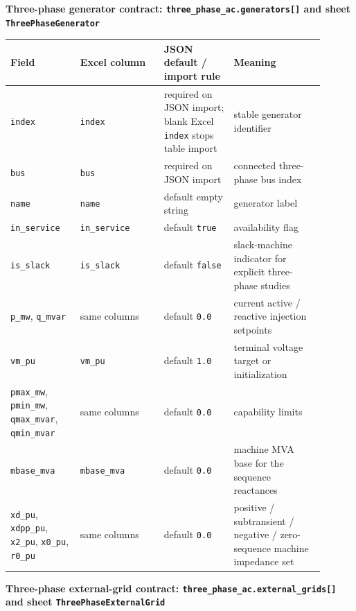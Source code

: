 \noindent\textbf{Three-phase generator contract: \texttt{three\_phase\_ac.generators[]} and sheet \texttt{ThreePhaseGenerator}}

\begin{longtable}{L{0.20\linewidth}L{0.24\linewidth}L{0.20\linewidth}L{0.26\linewidth}}
\toprule
Field & Excel column & JSON default / import rule & Meaning \\
\midrule
\endhead
\texttt{index} & \texttt{index} & required on JSON import; blank Excel \texttt{index} stops table import & stable generator identifier \\
\texttt{bus} & \texttt{bus} & required on JSON import & connected three-phase bus index \\
\texttt{name} & \texttt{name} & default empty string & generator label \\
\texttt{in\_service} & \texttt{in\_service} & default \texttt{true} & availability flag \\
\texttt{is\_slack} & \texttt{is\_slack} & default \texttt{false} & slack-machine indicator for explicit three-phase studies \\
\texttt{p\_mw}, \texttt{q\_mvar} & same columns & default \texttt{0.0} & current active / reactive injection setpoints \\
\texttt{vm\_pu} & \texttt{vm\_pu} & default \texttt{1.0} & terminal voltage target or initialization \\
\texttt{pmax\_mw}, \texttt{pmin\_mw}, \texttt{qmax\_mvar}, \texttt{qmin\_mvar} & same columns & default \texttt{0.0} & capability limits \\
\texttt{mbase\_mva} & \texttt{mbase\_mva} & default \texttt{0.0} & machine MVA base for the sequence reactances \\
\texttt{xd\_pu}, \texttt{xdpp\_pu}, \texttt{x2\_pu}, \texttt{x0\_pu}, \texttt{r0\_pu} & same columns & default \texttt{0.0} & positive / subtransient / negative / zero-sequence machine impedance set \\
\bottomrule
\end{longtable}

\noindent\textbf{Three-phase external-grid contract: \texttt{three\_phase\_ac.external\_grids[]} and sheet \texttt{ThreePhaseExternalGrid}}

